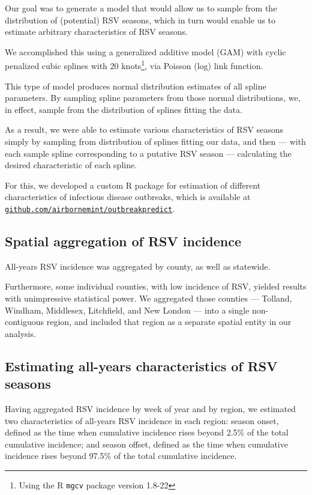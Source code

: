 \documentclass{article}\usepackage[]{graphicx}\usepackage[]{color}
\begin{document}
\begin{multicols}{2}
Our goal was to generate a model that would allow us to sample from the distribution of (potential) RSV seasons, which in turn would enable us to estimate arbitrary characteristics of RSV seasons. 

We accomplished this using a generalized additive model (GAM) with cyclic penalized cubic splines with 20 knots\footnote{Using the R \texttt{mgcv} package version 1.8-22}, via Poisson (log) link function.

This type of model produces normal distribution estimates of all spline parameters. By sampling spline parameters from those normal distributions, we, in effect, sample from the distribution of splines fitting the data.

As a result, we were able to estimate various characteristics of RSV seasons simply by sampling from distribution of splines fitting our data, and then --- with each sample spline corresponding to a putative RSV season --- calculating the desired characteristic of each spline. 

For this, we developed a custom R package for estimation of different characteristics of infectious disease outbreaks, which is available at \href{https://github.com/airbornemint/outbreakpredict}{\nolinkurl{github.com/airbornemint/outbreakpredict}}.

\subsection{Spatial aggregation of RSV incidence}

All-years RSV incidence was aggregated by county, as well as statewide. 

Furthermore, some individual counties, with low incidence of RSV, yielded results with unimpressive statistical power. We aggregated those counties --- Tolland, Windham, Middlesex, Litchfield, and New London --- into a single non-contiguous region, and included that region as a separate spatial entity in our analysis.

\subsection{Estimating all-years characteristics of RSV seasons}

Having aggregated RSV incidence by week of year and by region, we estimated two characteristics of all-years RSV incidence in each region: season onset, defined as the time when cumulative incidence rises beyond 2.5\% of the total cumulative incidence; and season offset, defined as the time when cumulative incidence rises beyond 97.5\% of the total cumulative incidence. 


\end{multicols}
\end{document}
